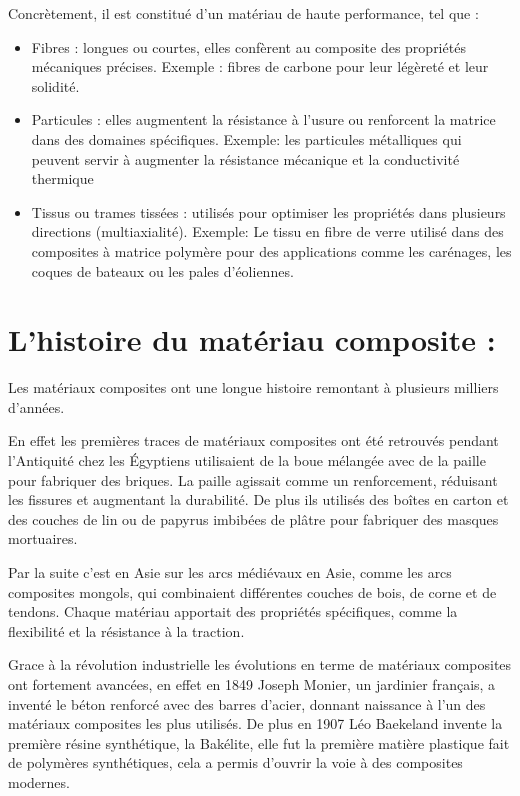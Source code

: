 \begin{itemize}
    Concrètement, il est constitué d'un matériau de haute performance, tel que :


    \begin{itemize}

        \item Fibres : longues ou courtes, elles confèrent au composite des propriétés mécaniques précises. Exemple : fibres de carbone pour leur légèreté et leur solidité.

        \item Particules : elles augmentent la résistance à l'usure ou renforcent la matrice dans des domaines spécifiques. Exemple: les particules métalliques qui peuvent servir à augmenter la résistance mécanique et la conductivité thermique

        \item Tissus ou trames tissées : utilisés pour optimiser les propriétés dans plusieurs directions (multiaxialité). Exemple: Le tissu en fibre de verre utilisé dans des composites à matrice polymère pour des applications comme les carénages, les coques de bateaux ou les pales d'éoliennes.

    \end{itemize}


\end{itemize}


\section{L’histoire du matériau composite :}

Les matériaux composites ont une longue histoire remontant à plusieurs milliers d’années.


En effet les premières traces de matériaux composites ont été retrouvés pendant l’Antiquité chez les Égyptiens utilisaient de la boue mélangée avec de la paille pour fabriquer des briques.
La paille agissait comme un renforcement, réduisant les fissures et augmentant la durabilité. De plus ils utilisés des boîtes en carton et des couches de lin ou de papyrus imbibées de plâtre pour fabriquer des masques mortuaires.


Par la suite c’est en Asie sur les arcs médiévaux en Asie, comme les arcs composites mongols, qui combinaient différentes couches de bois, de corne et de tendons.
Chaque matériau apportait des propriétés spécifiques, comme la flexibilité et la résistance à la traction.


Grace à la révolution industrielle les évolutions en terme de matériaux composites ont fortement avancées, en effet en 1849 Joseph Monier, un jardinier français, a inventé le béton renforcé avec des barres d'acier, donnant naissance à l'un des matériaux composites les plus utilisés.
De plus en 1907 Léo Baekeland invente la première résine synthétique, la Bakélite, elle fut la première matière plastique fait de polymères synthétiques, cela a permis d’ouvrir la voie à des composites modernes.


